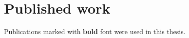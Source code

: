\chapter{Published work}

Publications marked with \textbf{bold} font were used in this thesis.

\begin{refsection}
\nocite{parallelintime,tn,bruteforce,railwaydispatching,omnisolver,pyqbench}
\printbibliography[heading=none]
\end{refsection}

